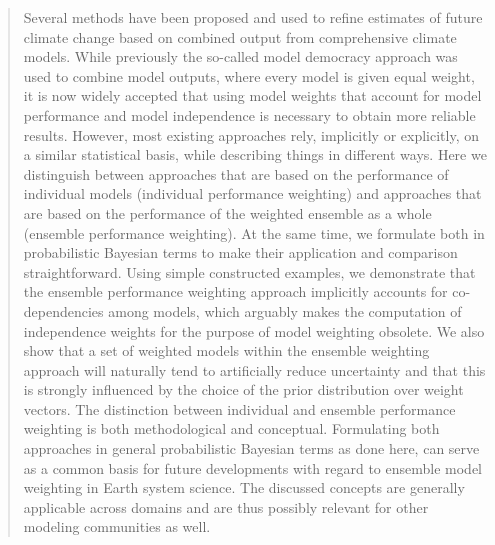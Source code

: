 \begin{abstract}
Several methods have been proposed and used to refine estimates of future climate change based on combined output from comprehensive climate models. While previously the so-called model democracy approach was used to combine model outputs, where every model is given equal weight, it is now widely accepted that using model weights that account for model performance and model independence is necessary to obtain more reliable results. However, most existing approaches rely, implicitly or explicitly, on a similar statistical basis, while describing things in different ways. 
Here we distinguish between approaches that are based on the performance of individual models (individual performance weighting) and approaches that are based on the performance of the weighted ensemble as a whole (ensemble performance weighting). At the same time, we formulate both in probabilistic Bayesian terms to make their application and comparison straightforward. Using simple constructed examples, we demonstrate that the ensemble performance weighting approach implicitly accounts for co-dependencies among models, which arguably makes the computation of independence weights for the purpose of model weighting obsolete. We also show that a set of weighted models within the ensemble weighting approach will naturally tend to artificially reduce uncertainty and that this is strongly influenced by the choice of the prior distribution over weight vectors. The distinction between individual and ensemble performance weighting is both methodological and conceptual. Formulating both approaches in general probabilistic Bayesian terms as done here, can serve as a common basis for future developments with regard to ensemble model weighting in Earth system science. The discussed concepts are generally applicable across domains and are thus possibly relevant for other modeling communities as well.
\end{abstract}